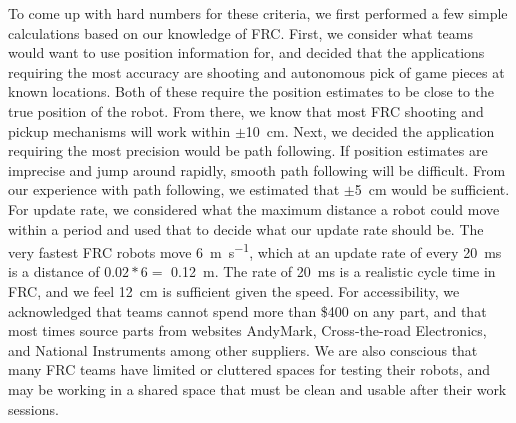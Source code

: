 \documentclass{article}
\begin{document}
To come up with hard numbers for these criteria, we first performed a few simple calculations based on our knowledge of FRC. First, we consider what teams would want to use position information for, and decided that the applications requiring the most accuracy are shooting and autonomous pick of game pieces at known locations. Both of these require the position estimates to be close to the true position of the robot. From there, we know that most FRC shooting and pickup mechanisms will work within $\pm$\SI{10}{\centi\meter}. Next, we decided the application requiring the most precision would be path following. If position estimates are imprecise and jump around rapidly, smooth path following will be difficult. From our experience with path following, we estimated that $\pm$\SI{5}{\centi\meter} would be sufficient. For update rate, we considered what the maximum distance a robot could move within a period and used that to decide what our update rate should be. The very fastest FRC robots move \SI{6}{\meter\per\second}, which at an update rate of every \SI{20}{\milli\second} is a distance of $0.02*6 =$ \SI{0.12}{\meter}. The rate of \SI{20}{\milli\second} is a realistic cycle time in FRC, and we feel \SI{12}{\centi\meter} is sufficient given the speed. For accessibility, we acknowledged that teams cannot spend more than \$400 on any part, and that most times source parts from websites AndyMark, Cross-the-road Electronics, and National Instruments among other suppliers. We are also conscious that many FRC teams have limited or cluttered spaces for testing their robots, and may be working in a shared space that must be clean and usable after their work sessions.
\end{document}

